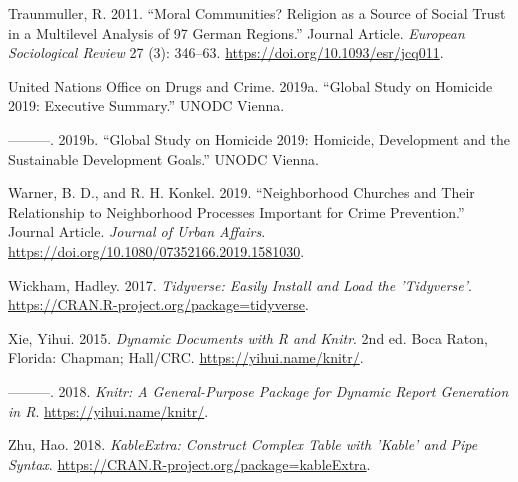 \documentclass[smallextended]{svjour3}       %
\begin{document}
\leavevmode\hypertarget{ref-Traunmuller2011moral}{}%
Traunmuller, R. 2011. ``Moral Communities? Religion as a Source of
Social Trust in a Multilevel Analysis of 97 German Regions.'' Journal
Article. \emph{European Sociological Review} 27 (3): 346--63.
\url{https://doi.org/10.1093/esr/jcq011}.

\leavevmode\hypertarget{ref-Unodc2019executive}{}%
United Nations Office on Drugs and Crime. 2019a. ``Global Study on
Homicide 2019: Executive Summary.'' UNODC Vienna.

\leavevmode\hypertarget{ref-Unodc2019development}{}%
---------. 2019b. ``Global Study on Homicide 2019: Homicide, Development
and the Sustainable Development Goals.'' UNODC Vienna.

\leavevmode\hypertarget{ref-Warner2019neighborhood}{}%
Warner, B. D., and R. H. Konkel. 2019. ``Neighborhood Churches and Their
Relationship to Neighborhood Processes Important for Crime Prevention.''
Journal Article. \emph{Journal of Urban Affairs}.
\url{https://doi.org/10.1080/07352166.2019.1581030}.

\leavevmode\hypertarget{ref-Wickham2017}{}%
Wickham, Hadley. 2017. \emph{Tidyverse: Easily Install and Load the
'Tidyverse'}. \url{https://CRAN.R-project.org/package=tidyverse}.

\leavevmode\hypertarget{ref-Xie2015}{}%
Xie, Yihui. 2015. \emph{Dynamic Documents with R and Knitr}. 2nd ed.
Boca Raton, Florida: Chapman; Hall/CRC. \url{https://yihui.name/knitr/}.

\leavevmode\hypertarget{ref-Xie2018}{}%
---------. 2018. \emph{Knitr: A General-Purpose Package for Dynamic
Report Generation in R}. \url{https://yihui.name/knitr/}.

\leavevmode\hypertarget{ref-Zhu2018}{}%
Zhu, Hao. 2018. \emph{KableExtra: Construct Complex Table with 'Kable'
and Pipe Syntax}. \url{https://CRAN.R-project.org/package=kableExtra}.



\end{document}
